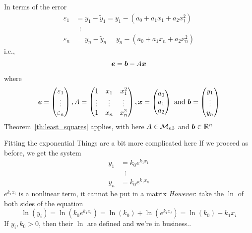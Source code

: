 \documentclass[aspectratio=169]{beamer}\usepackage[]{graphicx}\usepackage[]{xcolor}
\begin{document}
\begin{frame}
In terms of the error
\begin{align*}
\varepsilon_1 &= y_1-\tilde y_1 = y_1-(a_0+a_1x_1+a_2x_1^2) \\
&\;\;\vdots\\
\varepsilon_n &= y_n-\tilde y_n = y_n-(a_0+a_1x_n+a_2x_n^2)
\end{align*}
i.e.,
\[
\bm{e} = \bm{b}-A\bm{x} 
\]
where
\[
\bm{e} = \begin{pmatrix}
\varepsilon_1\\ \vdots\\ \varepsilon_n
\end{pmatrix},
A=\begin{pmatrix}
1 & x_1 & x_1^2\\ \vdots & \vdots & \vdots \\ 1 & x_n & x_n^2
\end{pmatrix},
\bm{x} = \begin{pmatrix}
a_0\\a_1\\a_2
\end{pmatrix}\textrm{ and }
\bm{b} = \begin{pmatrix}
y_1\\ \vdots\\ y_n
\end{pmatrix}
\]
\vfill
Theorem~\ref{th:least_squares} applies, with here $A\in\mathcal{M}_{n3}$ and $\bm{b}\in\mathbb{R}^n$
\end{frame}


\begin{frame}{Fitting the exponential}
Things are a bit more complicated here
\vfill
If we proceed as before, we get the system
\begin{align*}
y_1 &= k_0 e^{k_1x_1} \\
&\;\;\vdots \\
y_n &= k_0 e^{k_1x_n}
\end{align*}
$e^{k_1x_i}$ is a nonlinear term, it cannot be put in a matrix
\vfill
\emph{However}: take the $\ln$ of both sides of the equation
\[
\ln(y_i) = \ln(k_0e^{k_1x_i}) = \ln(k_0)+\ln(e^{k_1x_i}) = \ln(k_0)+k_1x_i
\]
If $y_i,k_0>0$, then their $\ln$ are defined and we're in business..
\end{frame}
\end{document}
